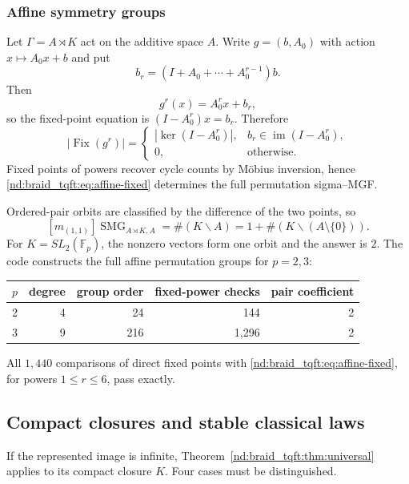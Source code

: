 \documentclass[10pt]{article}
\newcommand{\Fix}{\operatorname{Fix}}
\newcommand{\SMG}{\operatorname{SMG}}
\newcommand{\MGF}{\SMG}
\newcommand{\F}{\mathbb F}
\begin{document}
\subsubsection{Affine symmetry groups}

Let $\Gamma=A\rtimes K$ act on the additive space $A$.  Write
$g=(b,A_0)$ with action $x\mapsto A_0x+b$ and put
\[
b_r=(I+A_0+\cdots+A_0^{r-1})b.
\]
Then
\[
g^r(x)=A_0^rx+b_r,
\]
so the fixed-point equation is $(I-A_0^r)x=b_r$.  Therefore
\begin{equation}\label{nd:braid_tqft:eq:affine-fixed}
\boxed{
|\Fix(g^r)|=
\begin{cases}
|\ker(I-A_0^r)|,&b_r\in\operatorname{im}(I-A_0^r),\\
0,&\text{otherwise}.
\end{cases}}
\end{equation}
Fixed points of powers recover cycle counts by M\"obius inversion, hence
\eqref{nd:braid_tqft:eq:affine-fixed} determines the full permutation sigma--MGF.

Ordered-pair orbits are classified by the difference of the two points, so
\begin{equation}\label{nd:braid_tqft:eq:affine-pair}
[m_{(1,1)}]\MGF_{A\rtimes K,A}
=\#(K\backslash A)=1+\#(K\backslash(A\setminus\{0\})).
\end{equation}
For $K=SL_2(\F_p)$, the nonzero vectors form one orbit and the answer is $2$.
The code constructs the full affine permutation groups for $p=2,3$:
\begin{center}
\begin{tabular}{@{}crrrr@{}}
\toprule
$p$&degree&group order&fixed-power checks&pair coefficient\\
\midrule
2&4&24&144&2\\
3&9&216&1,296&2\\
\bottomrule
\end{tabular}
\end{center}
All $1,440$ comparisons of direct fixed points with
\eqref{nd:braid_tqft:eq:affine-fixed}, for powers $1\leq r\leq6$, pass exactly.

\subsection{Compact closures and stable classical laws}

If the represented image is infinite, Theorem~\ref{nd:braid_tqft:thm:universal} applies to
its compact closure $K$.  Four cases must be distinguished.
\end{document}
